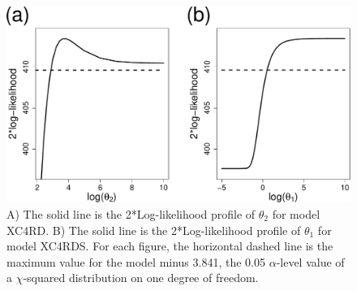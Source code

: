 \documentclass[11pt, titlepage]{article}\usepackage[]{graphicx}\usepackage[]{color}
\begin{document}
\begin{spacing}{1.9}
\begin{flushleft}
\begin{figure}[H]
  \begin{center}
  \includegraphics[width=\linewidth]{figure/Fig-thetaProfiles-crop.pdf}
  \end{center}
  \caption{A) The solid line is the 2*Log-likelihood profile of $\theta_2$ for model XC4RD. B) The solid line is the 2*Log-likelihood profile of $\theta_1$ for model XC4RDS.  For each figure, the horizontal dashed line is the maximum value for the model minus 3.841, the 0.05 $\alpha$-level value of a $\chi$-squared distribution on one degree of freedom. \label{Fig-thetaProfiles}}     
\end{figure}





\end{flushleft}
\end{spacing}
\end{document}
